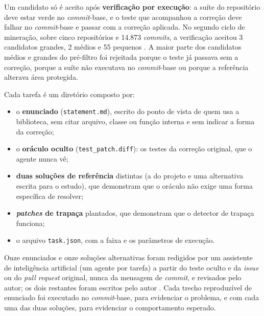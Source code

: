 Um candidato só é aceito após \textbf{verificação por execução}: a suíte do repositório deve estar verde no \textit{commit}-base, e o teste que acompanhou a correção deve falhar no \textit{commit}-base e passar com a correção aplicada. No segundo ciclo de mineração, sobre cinco repositórios e 14.873 \textit{commits}, a verificação aceitou 3 candidatos grandes, 2 médios e 55 pequenos . A maior parte dos candidatos médios e grandes do pré-filtro foi rejeitada porque o teste já passava sem a correção, porque a suíte não executava no \textit{commit}-base ou porque a referência alterava área protegida. 

Cada tarefa é um diretório composto por:

\begin{itemize}
    \item o \textbf{enunciado} (\texttt{statement.md}), escrito do ponto de vista de quem usa a biblioteca, sem citar arquivo, classe ou função interna e sem indicar a forma da correção;
    \item o \textbf{oráculo oculto} (\texttt{test\_patch.diff}): os testes da correção original, que o agente nunca vê;
    \item \textbf{duas soluções de referência} distintas (a do projeto e uma alternativa escrita para o estudo), que demonstram que o oráculo não exige uma forma específica de resolver;
    \item \textbf{\textit{patches} de trapaça} plantados, que demonstram que o detector de trapaça funciona;
    \item o arquivo \texttt{task.json}, com a faixa e os parâmetros de execução.
\end{itemize}

Onze enunciados e onze soluções alternativas foram redigidos por um assistente de inteligência artificial (um agente por tarefa) a partir do teste oculto e da \textit{issue} ou do \textit{pull request} original, nunca da mensagem de \textit{commit}, e revisados pelo autor; os dois restantes foram escritos pelo autor . Cada trecho reproduzível de enunciado foi executado no \textit{commit}-base, para evidenciar o problema, e com cada uma das duas soluções, para evidenciar o comportamento esperado.

